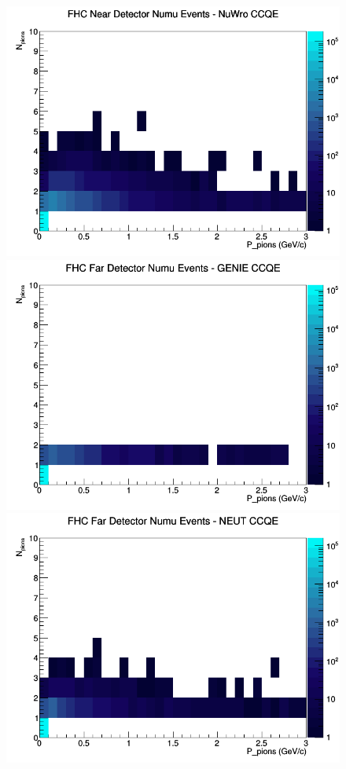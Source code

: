 \documentclass[12pt]{article}
\begin{document}
\begin{figure}[h]
\includegraphics[width=\linewidth]{N_P/nominal/pions/CCQE_FHC_ND_numu_N_P_NuWro.png}
\endminipage
\newline
{}
\includegraphics[width=\linewidth]{N_P/nominal/pions/CCQE_FHC_FD_numu_N_P_GENIE.png}
\endminipage
{}
\includegraphics[width=\linewidth]{N_P/nominal/pions/CCQE_FHC_FD_numu_N_P_NEUT.png}

\end{figure}
\end{document}
